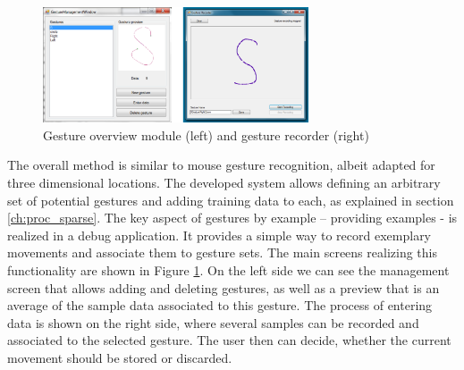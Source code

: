 \begin{figure}[ht]
\centering
\includegraphics[width=0.7\textwidth]{images/magicbox_data_gest}
\caption{Gesture overview module (left) and gesture recorder (right) \cite{braun2013capacitive}}
\label{fig:magicbox_data_gest}
\end{figure}

The overall method is similar to mouse gesture recognition, albeit adapted for three dimensional locations. The developed system allows defining an arbitrary set of potential gestures and adding training data to each, as explained in section \ref{ch:proc_sparse}. The key aspect of gestures by example – providing examples - is realized in a debug application. It provides a simple way to record exemplary movements and associate them to gesture sets. The main screens realizing this functionality are shown in Figure \ref{fig:magicbox_data_gest}. On the left side we can see the management screen that allows adding and deleting gestures, as well as a preview that is an average of the sample data associated to this gesture. The process of entering data is shown on the right side, where several samples can be recorded and associated to the selected gesture. The user then can decide, whether the current movement should be stored or discarded.
